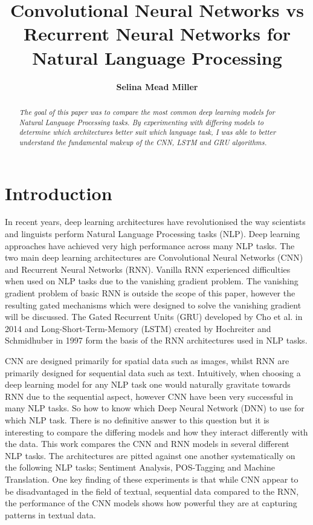 \documentclass[twocolumn,12pt]{asme2ej}
\title{\textrm{\textbf{\LARGE{Convolutional Neural Networks vs Recurrent Neural Networks for Natural Language Processing}}}}
\author{\textrm{\textbf{\large{Selina Mead Miller}}}
    \affiliation{
    \textrm{\large{Tübingen Universität}}\\
	\textrm{\textit{Sequence and Structure Learning}}\\
	\textrm{WS18/19}\\
    \small{selinamead@live.com}\\
    \small{Matrikelnummer: 4065083}\\
    }	
}
\begin{document}
\maketitle  



\begin{abstract}
\begin{center}
{\it The goal of this paper was to compare the most common deep learning models for Natural Language Processing tasks. By experimenting with differing models to determine which architectures better suit which language task, I was able to better understand the fundamental makeup of the CNN, LSTM and GRU algorithms. 
}
\end{center}
\end{abstract}


\section{Introduction}

In recent years, deep learning architectures have revolutionised the way scientists and linguists perform Natural Language Processing tasks (NLP). Deep learning approaches have achieved very high performance across many NLP tasks. The two main deep learning architectures are Convolutional Neural Networks (CNN) and Recurrent Neural Networks (RNN). Vanilla RNN experienced difficulties when used on NLP tasks due to the vanishing gradient problem. The vanishing gradient problem of basic RNN is outside the scope of this paper, however the resulting gated mechanisms which were designed to solve the vanishing gradient will be discussed. The Gated Recurrent Units (GRU) developed by Cho et al. in 2014 \cite{GatedRecurrentNeuralNetworksonSequenceModeling} and Long-Short-Term-Memory (LSTM) created by Hochreiter and Schmidhuber in 1997 \cite{LongShortTermMemory} form the basis of the RNN architectures used in NLP tasks.

CNN are designed primarily for spatial data such as images, whilst RNN are primarily designed for sequential data such as text. Intuitively, when choosing a deep learning model for any NLP task one would naturally gravitate towards RNN due to the sequential aspect, however CNN have been very successful in many NLP tasks. So how to know which Deep Neural Network (DNN) to use for which NLP task. There is no definitive answer to this question but it is interesting to compare the differing models and how they interact differently with the data. 
This work compares the CNN and RNN models in several different NLP tasks. The architectures are pitted against one another systematically on the following NLP tasks; Sentiment Analysis, POS-Tagging and Machine Translation. One key finding of these experiments is that while CNN appear to be disadvantaged in the field of textual, sequential data compared to the RNN, the performance of the CNN models shows how powerful they are at capturing patterns in textual data.
\end{document}
